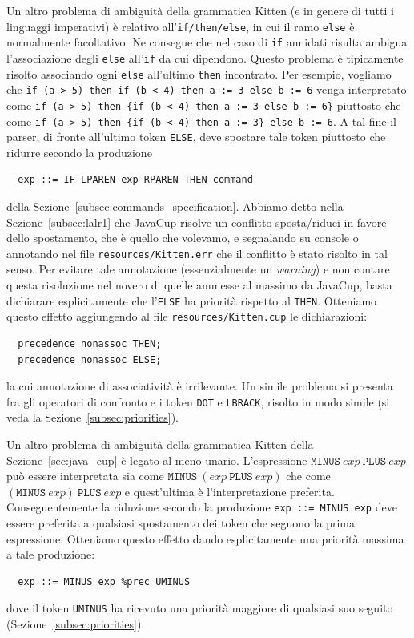 Un altro problema di ambiguit\`a della grammatica Kitten (e in genere di
tutti i linguaggi imperativi) \`e relativo
all'\texttt{if/then/else}, in cui il ramo \texttt{else} \`e normalmente
facoltativo. Ne consegue che nel caso di \texttt{if} annidati risulta ambigua
l'associazione degli \texttt{else} all'\texttt{if} da cui dipendono.
Questo problema \`e tipicamente risolto associando
ogni \texttt{else} all'ultimo \texttt{then} incontrato. Per esempio,
vogliamo che
\texttt{if (a > 5) then if (b < 4) then a := 3 else b := 6}
venga interpretato come
\texttt{if (a > 5) then \{if (b < 4) then a := 3 else b := 6\}}
piuttosto che come
\texttt{if (a > 5) then \{if (b < 4) then a := 3\} else b := 6}.
A tal fine il parser, di fronte all'ultimo token \texttt{ELSE},
deve spostare tale token piuttosto che ridurre secondo la produzione
%
\begin{verbatim}
  exp ::= IF LPAREN exp RPAREN THEN command
\end{verbatim}
%
della Sezione~\ref{subsec:commands_specification}.
Abbiamo detto nella Sezione~\ref{subsec:lalr1} che
JavaCup risolve un conflitto sposta/riduci in favore dello spostamento,
che \`e quello che volevamo, e segnalando su console o annotando nel
file \texttt{resources/Kitten.err} che il conflitto \`e stato risolto in
tal senso. Per evitare tale annotazione (essenzialmente un \emph{warning})
e non contare questa risoluzione nel novero di quelle ammesse al massimo
da JavaCup, basta dichiarare esplicitamente che l'\texttt{ELSE} ha priorit\`a
rispetto al \texttt{THEN}. Otteniamo questo effetto aggiungendo al file
\texttt{resources/Kitten.cup} le dichiarazioni:
%
\begin{verbatim}
  precedence nonassoc THEN;
  precedence nonassoc ELSE;
\end{verbatim}
%
la cui annotazione di associativit\`a \`e irrilevante.
Un simile problema si presenta fra gli operatori di confronto e i token
\texttt{DOT} e \texttt{LBRACK}, risolto in modo simile (si veda la
Sezione~\ref{subsec:priorities}).

Un altro problema di ambiguit\`a della grammatica Kitten della
Sezione~\ref{sec:java_cup} \`e legato al meno unario. L'espressione
$\mathtt{MINUS}\ \mathit{exp}\ \mathtt{PLUS}\ \mathit{exp}$ pu\`o
essere interpretata sia come
$\mathtt{MINUS}\ (\mathit{exp}\ \mathtt{PLUS}\ \mathit{exp})$ che come
$(\mathtt{MINUS}\ \mathit{exp})\ \mathtt{PLUS}\ \mathit{exp}$ e quest'ultima
\`e l'interpretazione preferita. Conseguentemente la riduzione
secondo la produzione \texttt{exp ::= MINUS exp} deve essere preferita
a qualsiasi spostamento dei token che seguono la prima espressione.
Otteniamo questo effetto dando esplicitamente una priorit\`a massima a tale
produzione:
%
\begin{verbatim}
  exp ::= MINUS exp %prec UMINUS
\end{verbatim}
%
dove il token \texttt{UMINUS} ha ricevuto una priorit\`a maggiore di qualsiasi
suo seguito (Sezione~\ref{subsec:priorities}).

